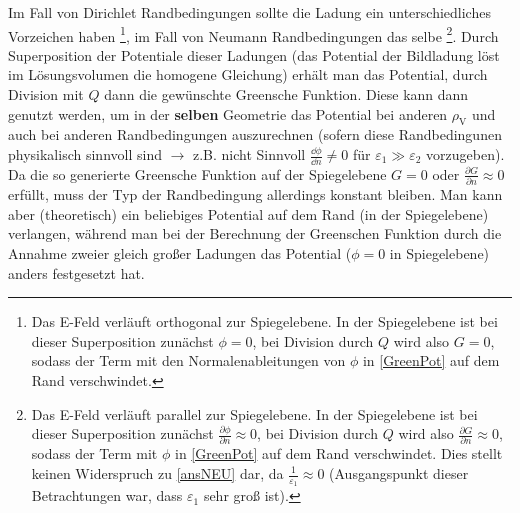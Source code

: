 		   Im Fall von Dirichlet Randbedingungen sollte die Ladung ein unterschiedliches Vorzeichen haben \footnote{Das E-Feld verläuft orthogonal zur Spiegelebene. In der Spiegelebene ist bei dieser Superposition zunächst $\phi=0$, bei Division durch $Q$ wird also $G=0$, sodass der Term mit den Normalenableitungen von $\phi$ in \ref{GreenPot} auf dem Rand verschwindet.}, im Fall von Neumann Randbedingungen das selbe \footnote{Das E-Feld verläuft parallel zur Spiegelebene. In der Spiegelebene ist bei dieser Superposition zunächst $\frac{\partial\phi}{\partial n}\approx0$, bei Division durch $Q$ wird also $\frac{\partial G}{\partial n}\approx0$, sodass der Term mit $\phi$ in \ref{GreenPot} auf dem Rand verschwindet. Dies stellt keinen Widerspruch zu \ref{ansNEU} dar, da $\frac{1}{\varepsilon_1}\approx 0$ (Ausgangspunkt dieser Betrachtungen war, dass $\varepsilon_{1}$ sehr groß ist).}. Durch Superposition der Potentiale dieser Ladungen (das Potential der Bildladung löst im Lösungsvolumen die homogene Gleichung) erhält man das Potential, durch Division mit $Q$ dann die gewünschte Greensche Funktion. Diese kann dann genutzt werden, um in der \textbf{selben} Geometrie das Potential bei anderen $\rho_{\text{V}}$ und auch bei anderen Randbedingungen auszurechnen (sofern diese Randbedingunen physikalisch sinnvoll sind $\to$ z.B. nicht Sinnvoll $\frac{\dd \phi}{\dd n}\neq 0$ für $\varepsilon_1\gg\varepsilon_2$ vorzugeben). Da die so generierte Greensche Funktion auf der Spiegelebene $G=0$ oder $\frac{\partial G}{\partial n}\approx0$ erfüllt, muss der Typ der Randbedingung allerdings konstant bleiben. Man kann aber (theoretisch) ein beliebiges Potential auf dem Rand (in der Spiegelebene) verlangen, während man bei der Berechnung der Greenschen Funktion durch die Annahme zweier gleich großer Ladungen das Potential ($\phi=0$ in Spiegelebene) anders festgesetzt hat.
